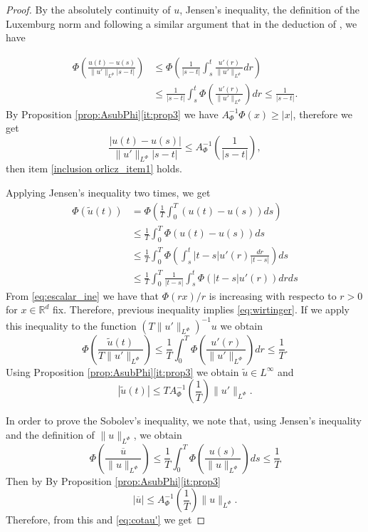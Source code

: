 \documentclass[twoside]{article}
\theoremstyle{remark}
\newcommand{\orlnor}{\|_{L^{\Phi}}}
\newcommand{\rr}{\mathbb{R}}
\renewcommand{\leq}{\leqslant}
\renewcommand{\geq}{\geqslant}
\begin{document}
\begin{proof}  By the absolutely continuity of $u$, Jensen's inequality,  the definition of 
the Luxemburg norm and following a similar argument that in the deduction of \cite[Th. 4.5]{chamra2017anisotropic}, we have

\[
 \begin{split}
    \Phi\left( \frac{u(t)-u(s)}{\|u'\orlnor |s-t|}\right) &\leq  \Phi\left( \frac{1}{ |s-t|}\int_s^t  \frac{u'(r)}{\|u'\orlnor }dr\right)\\
    &\leq   \frac{1}{ |s-t|}\int_s^t  \Phi\left(\frac{u'(r)}{\|u'\orlnor }\right)dr
    \leq \frac{1}{ |s-t|}.
 \end{split}
\]
By Proposition \ref{prop:AsubPhi}\eqref{it:prop3}  we have $A^{-1}_{\Phi}\Phi(x)\geq |x|$, therefore we get
\[
    \frac{|u(t)-u(s)|}{\|u'\orlnor |s-t|} 
    \leq  A_{\Phi}^{-1}\left(\frac{1}{ |s-t|}\right),
\]
then  item \ref{inclusion orlicz_item1} holds.

Applying Jensen's inequality two times, we get
\begin{equation*}
\begin{split}
\Phi(\tilde{u}(t))&=\Phi\left(\frac{1}{T}\int_0^T \left(u(t)-u(s)\right) ds\right)\\
&\leq\frac{1}{T}\int_0^T \Phi(u(t)-u(s))ds\\
&\leq \frac{1}{T}\int_0^T \Phi\left(\int_s^t |t-s| u'(r)\frac{dr}{|t-s|}\right)ds\\
&\leq 
\frac{1}{T}\int_0^T \frac{1}{|t-s|} \int_s^t\Phi\left(|t-s| u'(r)\right)drds
\end{split}
\end{equation*}
From \eqref{eq:escalar_ine} we have that $\Phi(rx)/r$ is increasing with respecto to $r>0$ for $x\in\rr^d$ fix. Therefore, previous inequality  implies \eqref{eq:wirtinger}. If we apply this inequality to the function $\left(T\|u'\orlnor\right)^{-1}u$ we obtain
\[\Phi\left(\frac{\tilde{u}(t)}{T\|u'\orlnor}\right)\leq\frac{1}{T}\int_0^T \Phi\left(\frac{u'(r)}{\|u'\orlnor}\right)dr\leq\frac{1}{T}.\]
Using Proposition \ref{prop:AsubPhi}\eqref{it:prop3} we obtain $\tilde{u}\in L^{\infty}$ and
\begin{equation}\label{eq:cotau'}
 |\tilde{u}(t)|\leq TA_{\Phi}^{-1}\left(\frac{1}{T}\right)\|u'\orlnor.
\end{equation}




In order to prove the Sobolev's inequality, we note that, using Jensen's inequality and 
the definition of $\|u\orlnor$, we obtain
\[ \Phi\left( \frac{ \overline{u}}{\|u\orlnor} \right) \leq
\frac{1}{T}\int_0^T\Phi\left(\frac{u(s)}{\|u\orlnor}\right)ds\leq\frac{1}{T}
\]
Then  by By Proposition \ref{prop:AsubPhi}\eqref{it:prop3} 
\[|\overline{u}|\leq A_{\Phi}^{-1}\left(\frac{1}{T}\right) \|u\orlnor.\]
Therefore, from this and \eqref{eq:cotau'} we get


\end{proof}
\end{document}
